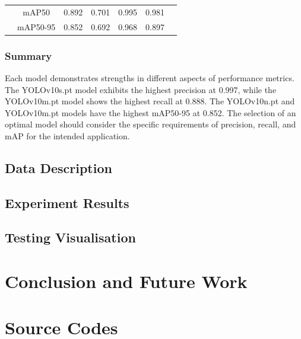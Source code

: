 \documentclass[12pt,oneside]{book} %
\begin{document}
\begin{table}[h!]
\begin{adjustbox}{max width=\textwidth}
\begin{tabular}{lcccccc}
                                                  & mAP50           & 0.892        & 0.701                       & 0.995                          & 0.981                     \\
                                                  & mAP50-95        & 0.852        & 0.692                       & 0.968                          & 0.897                     \\
            \bottomrule
        \end{tabular}
    \end{adjustbox}
    \label{tab:comparison}
\end{table}

\subsection{Summary}

Each model demonstrates strengths in different aspects of performance metrics.
The YOLOv10s.pt model exhibits the highest precision at 0.997, while the
YOLOv10m.pt model shows the highest recall at 0.888. The YOLOv10n.pt and
YOLOv10m.pt models have the highest mAP50-95 at 0.852. The selection of an
optimal model should consider the specific requirements of precision, recall,
and mAP for the intended application.

\section{Data Description}

\section{Experiment Results}

\section{Testing Visualisation}

\chapter{Conclusion and Future Work}\label{chap:conclusion}

\appendix
\chapter{Source Codes}
\end{document}
